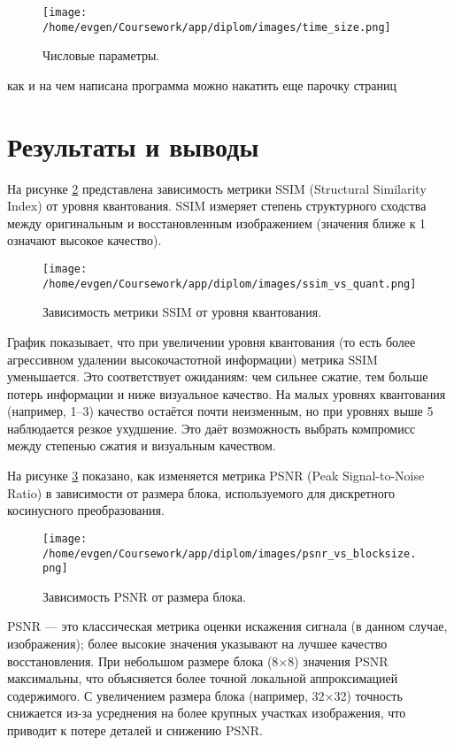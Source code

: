 \begin{figure}[h!]
    \centering
    \texttt{[image: /home/evgen/Coursework/app/diplom/images/time\_size.png]}
    \caption{Числовые параметры.}
    \label{fig:time_size}
\end{figure}

как и на чем написана программа можно накатить еще парочку страниц



\clearpage
\section{Результаты и выводы}


На рисунке \ref{fig:ssim_vs_quant} представлена зависимость метрики SSIM (Structural Similarity Index) от уровня квантования. 
SSIM измеряет степень структурного сходства между оригинальным и восстановленным изображением 
(значения ближе к 1 означают высокое качество).


\begin{figure}[H]
    \centering
    \texttt{[image: /home/evgen/Coursework/app/diplom/images/ssim\_vs\_quant.png]}
    \caption{Зависимость метрики SSIM от уровня квантования.}
    \label{fig:ssim_vs_quant}
\end{figure}

График показывает, что при увеличении уровня квантования 
(то есть более агрессивном удалении высокочастотной информации) метрика SSIM уменьшается. 
Это соответствует ожиданиям: чем сильнее сжатие, тем больше потерь информации и ниже визуальное качество. 
На малых уровнях квантования (например, 1–3) качество остаётся почти неизменным, но при уровнях выше 5 наблюдается резкое ухудшение. 
Это даёт возможность выбрать компромисс между степенью сжатия и визуальным качеством.


На рисунке \ref{fig:psnr_vs_blocksize} показано, как изменяется метрика PSNR (Peak Signal-to-Noise Ratio) в зависимости от размера блока, 
используемого для дискретного косинусного преобразования.

\begin{figure}[H]
    \centering
    \texttt{[image: /home/evgen/Coursework/app/diplom/images/psnr\_vs\_blocksize.png]}
    \caption{Зависимость PSNR от размера блока.}
    \label{fig:psnr_vs_blocksize}
\end{figure}

PSNR — это классическая метрика оценки искажения сигнала (в данном случае, изображения); 
более высокие значения указывают на лучшее качество восстановления. При небольшом размере блока 
(8×8) значения PSNR максимальны, что объясняется более точной локальной аппроксимацией содержимого. 
С увеличением размера блока (например, 32×32) точность снижается из-за усреднения на более крупных 
участках изображения, что приводит к потере деталей и снижению PSNR.

